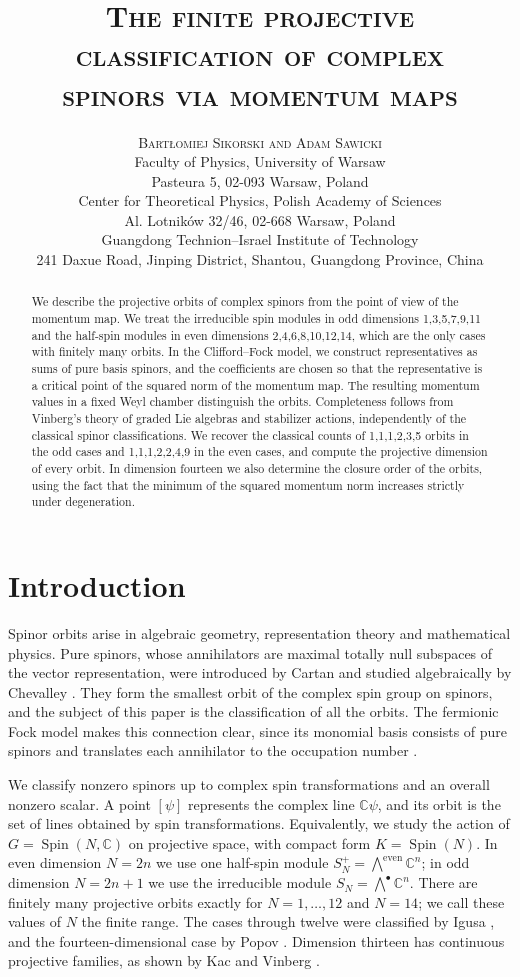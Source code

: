 \documentclass{article}
\title{%
    {\LARGE\bfseries\scshape
    The finite projective classification of complex\\[0.2em]
    spinors via momentum maps}%
}
\author{%
    {\large\scshape
    Bart\l{}omiej Sikorski\affnum{1} and Adam Sawicki\affnum{2,3}}
    \\[1.2em]
    {\small \affnum{1}Faculty of Physics, University of Warsaw}\\
    {\small Pasteura 5, 02-093 Warsaw, Poland}
    \\[0.7em]
    {\small \affnum{2}Center for Theoretical Physics,
    Polish Academy of Sciences}\\
    {\small Al. Lotnik\'ow 32/46, 02-668 Warsaw, Poland}\\[0.7em]
    {\small \affnum{3}Guangdong Technion--Israel Institute of Technology}\\
    {\small 241 Daxue Road, Jinping District, Shantou, Guangdong Province, China}   
}
\date{}
\theoremstyle{definition}
\theoremstyle{remark}
\newcommand{\C}{\mathbb C}
\newcommand{\Spin}{\operatorname{Spin}}
\begin{document}
\maketitle

\begin{abstract}
We describe the projective orbits of complex spinors from the point of
view of the momentum map. We treat the irreducible spin modules in odd
dimensions 1,3,5,7,9,11 and the half-spin modules in even dimensions
2,4,6,8,10,12,14, which are the only cases with finitely many orbits. 
In the Clifford--Fock model, we construct representatives as sums
of pure basis spinors, and the coefficients are chosen so that the representative is a critical point of the squared norm of the momentum map. The resulting momentum values in a fixed Weyl chamber distinguish the orbits.
Completeness follows from Vinberg's theory of graded Lie algebras and stabilizer actions, independently of the classical spinor
classifications.
We recover the classical counts of 1,1,1,2,3,5 orbits in the odd cases and 1,1,1,2,2,4,9 in the even cases, and compute the projective dimension of every orbit.
In dimension fourteen we also determine the closure order of the orbits, using the fact that the minimum of the squared momentum norm increases
strictly under degeneration.
\end{abstract}

\section{Introduction}
\label{sec:introduction}

Spinor orbits arise in algebraic geometry, representation theory and
mathematical physics. Pure spinors, whose annihilators are maximal totally null subspaces of the vector representation, were introduced by Cartan and studied
algebraically by Chevalley \cite{Cartan1966,Chevalley1954}. They form the
smallest orbit of the complex spin group on spinors, and the subject of this
paper is the classification of all the orbits. The fermionic Fock model makes this connection clear,
since its monomial basis consists of pure spinors and translates each annihilator to the occupation number
\cite{spinorial_chessboard,Trautman_Budinich,TrautmanTrautman}.

We classify nonzero spinors up to complex spin transformations and an
overall nonzero scalar. A point $[\psi]$ represents the complex line
$\C\psi$, and its orbit is the set of lines obtained by spin transformations.
Equivalently, we study the action of
$G=\Spin(N,\C)$ on projective space, with compact form
$K=\Spin(N)$. In even dimension $N=2n$ we use one half-spin module $S_N^+=\bigwedge^{\mathrm{even}}\C^n$; in odd
dimension $N=2n+1$ we use the irreducible module
$S_N=\bigwedge^\bullet\C^n$. There are finitely many projective orbits exactly for $N=1,\ldots,12$ and $N=14$; we call these values of $N$ the finite range. The cases through twelve were classified
by Igusa \cite{Igusa1970uptodim12}, and the fourteen-dimensional case by
Popov \cite{Popov_dim14RUS,Popov_dim14ENG}. Dimension thirteen has continuous projective
families, as shown by Kac and Vinberg \cite{Gatti_dim13}.
\end{document}
